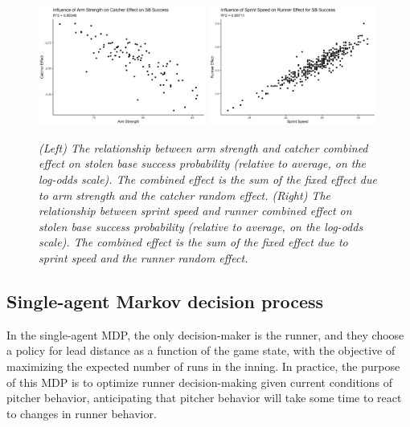 \documentclass{article}
\begin{document}
      \begin{figure}
        \centering
        \includegraphics[width = 0.49\textwidth]{figures/catcher_effect.png}
        \includegraphics[width = 0.49\textwidth]{figures/runner_effect.png}
        \caption{
          \it
          (Left) The relationship between arm strength and catcher combined effect on stolen base success probability (relative to average, on the log-odds scale). The combined effect is the sum of the fixed effect due to arm strength and the catcher random effect.
          (Right) The relationship between sprint speed and runner combined effect on stolen base success probability (relative to average, on the log-odds scale). The combined effect is the sum of the fixed effect due to sprint speed and the runner random effect.
        }
        \label{fig:random-effect}
      \end{figure}

    \subsection{Single-agent Markov decision process}

      In the single-agent MDP, the only decision-maker is the runner, and they choose a policy for lead distance as a function of the game state, with the objective of maximizing the expected number of runs in the inning. In practice, the purpose of this MDP is to optimize runner decision-making given current conditions of pitcher behavior, anticipating that pitcher behavior will take some time to react to changes in runner behavior.
\end{document}
